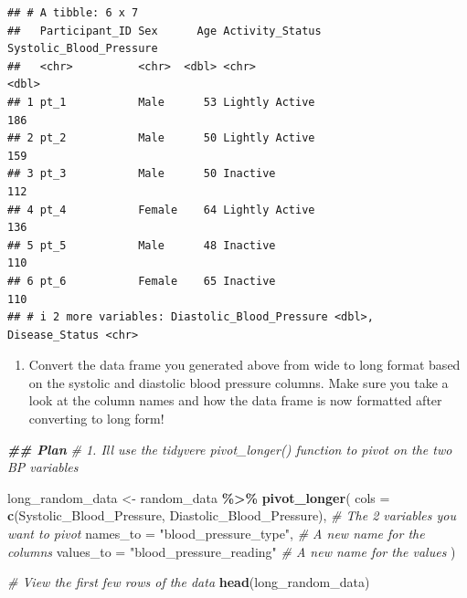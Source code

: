 \documentclass[
]{article}
\newenvironment{Shaded}{\begin{snugshade}}{\end{snugshade}}
\newcommand{\AttributeTok}[1]{\textcolor[rgb]{0.13,0.29,0.53}{#1}}
\newcommand{\CommentTok}[1]{\textcolor[rgb]{0.56,0.35,0.01}{\textit{#1}}}
\newcommand{\DocumentationTok}[1]{\textcolor[rgb]{0.56,0.35,0.01}{\textbf{\textit{#1}}}}
\newcommand{\FunctionTok}[1]{\textcolor[rgb]{0.13,0.29,0.53}{\textbf{#1}}}
\newcommand{\NormalTok}[1]{#1}
\newcommand{\OtherTok}[1]{\textcolor[rgb]{0.56,0.35,0.01}{#1}}
\newcommand{\SpecialCharTok}[1]{\textcolor[rgb]{0.81,0.36,0.00}{\textbf{#1}}}
\newcommand{\StringTok}[1]{\textcolor[rgb]{0.31,0.60,0.02}{#1}}
\providecommand{\tightlist}{%
  \setlength{\itemsep}{0pt}\setlength{\parskip}{0pt}}
\begin{document}
\begin{verbatim}
## # A tibble: 6 x 7
##   Participant_ID Sex      Age Activity_Status Systolic_Blood_Pressure
##   <chr>          <chr>  <dbl> <chr>                             <dbl>
## 1 pt_1           Male      53 Lightly Active                      186
## 2 pt_2           Male      50 Lightly Active                      159
## 3 pt_3           Male      50 Inactive                            112
## 4 pt_4           Female    64 Lightly Active                      136
## 5 pt_5           Male      48 Inactive                            110
## 6 pt_6           Female    65 Inactive                            110
## # i 2 more variables: Diastolic_Blood_Pressure <dbl>, Disease_Status <chr>
\end{verbatim}

\begin{enumerate}
\def\labelenumi{\arabic{enumi})}
\setcounter{enumi}{1}
\tightlist
\item
  Convert the data frame you generated above from wide to long format
  based on the systolic and diastolic blood pressure columns. Make sure
  you take a look at the column names and how the data frame is now
  formatted after converting to long form!
\end{enumerate}

\begin{Shaded}
\begin{Highlighting}[]
\DocumentationTok{\#\# Plan}
\CommentTok{\# 1. I\textquotesingle{}ll use the tidyvere pivot\_longer() function to pivot on the two BP variables}

\NormalTok{long\_random\_data }\OtherTok{\textless{}{-}}\NormalTok{ random\_data }\SpecialCharTok{\%\textgreater{}\%}
  \FunctionTok{pivot\_longer}\NormalTok{(}
    \AttributeTok{cols =} \FunctionTok{c}\NormalTok{(Systolic\_Blood\_Pressure, Diastolic\_Blood\_Pressure), }\CommentTok{\# The 2 variables you want to pivot}
    \AttributeTok{names\_to =} \StringTok{"blood\_pressure\_type"}\NormalTok{, }\CommentTok{\# A new name for the columns}
    \AttributeTok{values\_to =} \StringTok{"blood\_pressure\_reading"} \CommentTok{\# A new name for the values}
\NormalTok{  )}

\CommentTok{\# View the first few rows of the data}
\FunctionTok{head}\NormalTok{(long\_random\_data)}
\end{Highlighting}
\end{Shaded}
\end{document}
